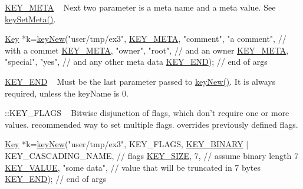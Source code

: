 \begin{DoxyItemize}
\item \hyperlink{group__key_gga91fb3178848bd682000958089abbaf40a040582834bb2d90049947d7ef74e87e2}{K\+E\+Y\+\_\+\+M\+E\+T\+A} ~\newline
 Next two parameter is a meta name and a meta value. See \hyperlink{group__keymeta_gae1f15546b234ffb6007d8a31178652b9}{key\+Set\+Meta()}. 
\begin{DoxyCodeInclude}
\hyperlink{classkdb_1_1Key_a5679f5cae63caddd64a60388b9cc77fa}{Key} *k=\hyperlink{group__key_gad23c65b44bf48d773759e1f9a4d43b89}{keyNew}(\textcolor{stringliteral}{"user/tmp/ex3"},
        \hyperlink{group__key_gga91fb3178848bd682000958089abbaf40a040582834bb2d90049947d7ef74e87e2}{KEY\_META}, \textcolor{stringliteral}{"comment"}, \textcolor{stringliteral}{"a comment"},  \textcolor{comment}{// with a commet}
        \hyperlink{group__key_gga91fb3178848bd682000958089abbaf40a040582834bb2d90049947d7ef74e87e2}{KEY\_META}, \textcolor{stringliteral}{"owner"}, \textcolor{stringliteral}{"root"},         \textcolor{comment}{// and an owner}
        \hyperlink{group__key_gga91fb3178848bd682000958089abbaf40a040582834bb2d90049947d7ef74e87e2}{KEY\_META}, \textcolor{stringliteral}{"special"}, \textcolor{stringliteral}{"yes"},        \textcolor{comment}{// and any other meta data}
        \hyperlink{group__key_gga91fb3178848bd682000958089abbaf40aa8adb6fcb92dec58fb19410eacfdd403}{KEY\_END});                  \textcolor{comment}{// end of args}
\end{DoxyCodeInclude}

\item \hyperlink{group__key_gga91fb3178848bd682000958089abbaf40aa8adb6fcb92dec58fb19410eacfdd403}{K\+E\+Y\+\_\+\+E\+N\+D} ~\newline
 Must be the last parameter passed to \hyperlink{group__key_gad23c65b44bf48d773759e1f9a4d43b89}{key\+New()}. It is always required, unless the {\ttfamily key\+Name} is 0.
\item \+::\+K\+E\+Y\+\_\+\+F\+L\+A\+G\+S ~\newline
 Bitwise disjunction of flags, which don't require one or more values. recommended way to set multiple flags. overrides previously defined flags. 
\begin{DoxyCodeInclude}
\hyperlink{classkdb_1_1Key_a5679f5cae63caddd64a60388b9cc77fa}{Key} *k=\hyperlink{group__key_gad23c65b44bf48d773759e1f9a4d43b89}{keyNew}(\textcolor{stringliteral}{"user/tmp/ex3"},
        KEY\_FLAGS, \hyperlink{group__key_gga91fb3178848bd682000958089abbaf40a1ca18d4e094ae7487d35ecedda2235ff}{KEY\_BINARY} | KEY\_CASCADING\_NAME, \textcolor{comment}{// flags}
        \hyperlink{group__key_gga91fb3178848bd682000958089abbaf40a6d531b5c41445d19d0452eebdccbfa01}{KEY\_SIZE}, 7,                    \textcolor{comment}{// assume binary length 7}
        \hyperlink{group__key_gga91fb3178848bd682000958089abbaf40ac66e4a49d09212b79f5754ca6db5bd2e}{KEY\_VALUE}, \textcolor{stringliteral}{"some data"},                \textcolor{comment}{// value that will be truncated in 7 bytes}
        \hyperlink{group__key_gga91fb3178848bd682000958089abbaf40aa8adb6fcb92dec58fb19410eacfdd403}{KEY\_END});                        \textcolor{comment}{// end of args}
\end{DoxyCodeInclude}


\end{DoxyItemize}
